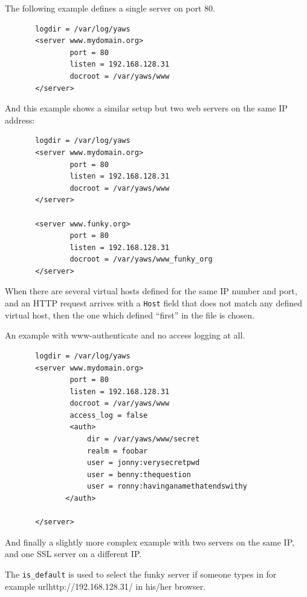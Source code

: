 \documentclass[11pt,oneside,english]{book}
\begin{document}
       The  following  example  defines a single server on
       port 80.

\begin{verbatim}
       logdir = /var/log/yaws
       <server www.mydomain.org>
               port = 80
               listen = 192.168.128.31
               docroot = /var/yaws/www
       </server>
\end{verbatim}

       And this example shows a similar setup but two web
       servers on the same IP address:

\begin{verbatim}
       logdir = /var/log/yaws
       <server www.mydomain.org>
               port = 80
               listen = 192.168.128.31
               docroot = /var/yaws/www
       </server>

       <server www.funky.org>
               port = 80
               listen = 192.168.128.31
               docroot = /var/yaws/www_funky_org
       </server>
\end{verbatim}


When there are several virtual hosts defined for the same IP number
and port, and an HTTP request arrives with a \verb+Host+ field that
does not match any defined virtual host, then the one which defined
``first'' in the file is chosen.

An example with www-authenticate and no access logging at all.

\begin{verbatim}
       logdir = /var/log/yaws
       <server www.mydomain.org>
               port = 80
               listen = 192.168.128.31
               docroot = /var/yaws/www
               access_log = false
               <auth>
                   dir = /var/yaws/www/secret
                   realm = foobar
                   user = jonny:verysecretpwd
                   user = benny:thequestion
                   user = ronny:havinganamethatendswithy
              </auth>

       </server>
\end{verbatim}

       And  finally  a  slightly more complex example with
       two servers on the same IP, and one SSL server on a
       different IP.

       The \verb+is_default+ is used to select the funky server if
       someone types in for example url{http://192.168.128.31/} in
       his\slash her browser.
\end{document}
